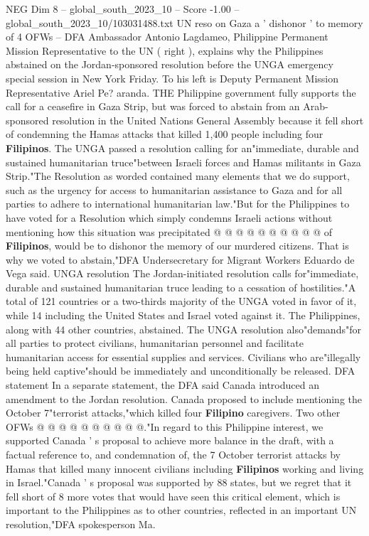 \begin{textsample}{NEG Dim 8 – global\_south\_2023\_10 – Score -1.00 – global\_south\_2023\_10/103031488.txt}  \label{ex:f8_neg_090}
UN reso on Gaza a ' dishonor ' to memory of 4 OFWs -- DFA Ambassador Antonio Lagdameo, Philippine Permanent Mission Representative to the UN ( right ), explains why the Philippines abstained on the Jordan-sponsored resolution before the UNGA emergency special session in New York Friday.
To his left is Deputy Permanent Mission Representative Ariel Pe? aranda.
THE Philippine government fully supports the call for a ceasefire in Gaza Strip, but was forced to abstain from an Arab-sponsored resolution in the United Nations General Assembly because it fell short of condemning the Hamas attacks that killed 1,400 people including four \textbf{Filipinos}.
The UNGA passed a resolution calling for an"immediate, durable and sustained humanitarian truce"between Israeli forces and Hamas militants in Gaza Strip."The Resolution as worded contained many elements that we do support, such as the urgency for access to humanitarian assistance to Gaza and for all parties to adhere to international humanitarian law."But for the Philippines to have voted for a Resolution which simply condemns Israeli actions without mentioning how this situation was precipitated @ @ @ @ @ @ @ @ @ @ of \textbf{Filipinos}, would be to dishonor the memory of our murdered citizens.
That is why we voted to abstain,"DFA Undersecretary for Migrant Workers Eduardo de Vega said.
UNGA resolution The Jordan-initiated resolution calls for"immediate, durable and sustained humanitarian truce leading to a cessation of hostilities."A total of 121 countries or a two-thirds majority of the UNGA voted in favor of it, while 14 including the United States and Israel voted against it.
The Philippines, along with 44 other countries, abstained.
The UNGA resolution also"demands"for all parties to protect civilians, humanitarian personnel and facilitate humanitarian access for essential supplies and services.
Civilians who are"illegally being held captive"should be immediately and unconditionally be released.
DFA statement In a separate statement, the DFA said Canada introduced an amendment to the Jordan resolution.
Canada proposed to include mentioning the October 7"terrorist attacks,"which killed four \textbf{Filipino} caregivers.
Two other OFWs @ @ @ @ @ @ @ @ @ @."In regard to this Philippine interest, we supported Canada ' s proposal to achieve more balance in the draft, with a factual reference to, and condemnation of, the 7 October terrorist attacks by Hamas that killed many innocent civilians including \textbf{Filipinos} working and living in Israel."Canada ' s proposal was supported by 88 states, but we regret that it fell short of 8 more votes that would have seen this critical element, which is important to the Philippines as to other countries, reflected in an important UN resolution,"DFA spokesperson Ma.

\end{textsample}
